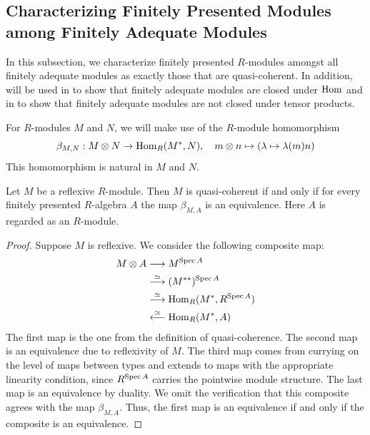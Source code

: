 \subsection{Characterizing Finitely Presented Modules among Finitely Adequate Modules}
\label{ss:char-fp}

In this subsection, we characterize finitely presented $R$-modules amongst all finitely adequate modules as exactly those that are quasi-coherent.
In addition,  will be used in
 to show that finitely adequate modules are closed under $\mathrm{Hom}$
and in  to show that finitely adequate modules are not closed
under tensor products.

For $R$-modules $M$ and $N$, we will make use of the $R$-module homomorphism
  \[
    \beta_{M,N} : M \otimes N \to \mathrm{Hom}_R(M^\ast, N), \quad
    m \otimes n \mapsto (\lambda \mapsto \lambda(m)n)
  \]
This homomorphism is natural in $M$ and $N$.

\begin{lemma}
  \label{identification-hom-tensor-for-fp-algebras}
  Let $M$ be a reflexive $R$-module.
  Then $M$ is quasi-coherent if and only if for every finitely presented $R$-algebra $A$ the map
  $\beta_{M,A}$ is an equivalence.
  Here $A$ is regarded as an $R$-module.
\end{lemma}

\begin{proof}
  Suppose $M$ is reflexive.
  We consider the following composite map:
  \begin{align*}
    M \otimes A &\longrightarrow M^{\operatorname{Spec} A} \\
                &\overset{\simeq}{\longrightarrow} (M^{\ast\ast})^{\operatorname{Spec} A} \\
                &\overset{\simeq}{\longrightarrow} \mathrm{Hom}_R(M^\ast, R^{\operatorname{Spec} A}) \\
                &\overset{\simeq}{\longleftarrow} \mathrm{Hom}_R(M^\ast, A)
  \end{align*}
  The first map is the one from the definition of quasi-coherence.
  The second map is an equivalence due to reflexivity of $M$.
  The third map comes from currying on the level of maps between types and extends to maps with the appropriate linearity condition, since $R^{\operatorname{Spec} A}$ carries the pointwise module structure.
  The last map is an equivalence by duality.
  We omit the verification that this composite agrees with the map $\beta_{M,A}$.
  Thus, the first map is an equivalence if and only if the composite is an equivalence.
\end{proof}

